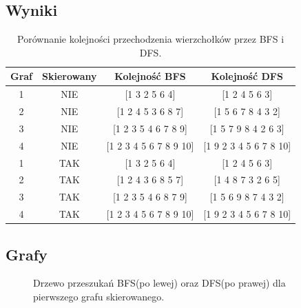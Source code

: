\documentclass{article}
\begin{document}
\subsection{Wyniki}
\begin{table}[H]
\begin{adjustbox}{center}
\begin{tabular}{|c|c|c|c|}
    \hline
    Graf & Skierowany & Kolejność BFS & Kolejność DFS\\
    \hline
    1 & NIE & [1 3 2 5 6 4] & [1 2 4 5 6 3]\\
    \hline
    2 & NIE & [1 2 4 5 3 6 8 7] & [1 5 6 7 8 4 3 2]\\
    \hline
    3 & NIE & [1 2 3 5 4 6 7 8 9] & [1 5 7 9 8 4 2 6 3]\\
    \hline
    4 & NIE & [1 2 3 4 5 6 7 8 9 10] & [1 9 2 3 4 5 6 7 8 10]\\
    \hline
    1 & TAK & [1 3 2 5 6 4] & [1 2 4 5 6 3]\\
    \hline
    2 & TAK & [1 2 4 3 6 8 5 7] & [1 4 8 7 3 2 6 5]\\
    \hline
    3 & TAK & [1 2 3 5 4 6 8 7 9] & [1 5 6 9 8 7 4 3 2]\\
    \hline
    4 & TAK & [1 2 3 4 5 6 7 8 9 10] & [1 9 2 3 4 5 6 7 8 10]\\
    \hline
\end{tabular}
\end{adjustbox}
\caption{Porównanie kolejności przechodzenia wierzchołków przez BFS i DFS.}
\end{table}

\subsection{Grafy}

\begin{figure}[H]
\begin{minipage}{0.45\textwidth} %
  \centering
\end{minipage}
\hfill
\begin{minipage}{0.45\textwidth} %
  \centering
\end{minipage}
\caption{Drzewo przeszukań BFS(po lewej) oraz DFS(po prawej) dla pierwszego grafu skierowanego.}
\end{figure}
\end{document}
